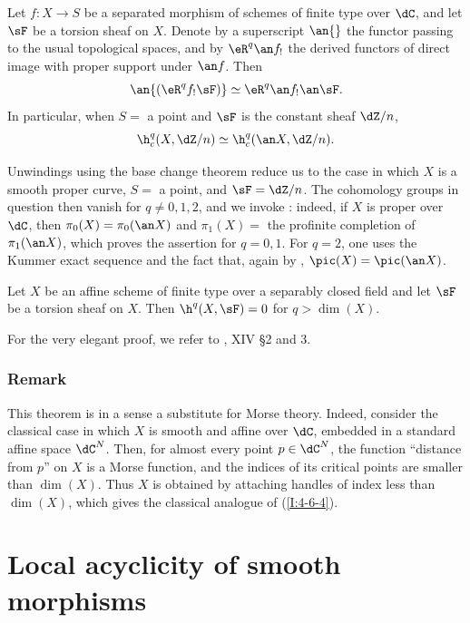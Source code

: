 \begin{theorem}\label{I:4-6-3}
Let $f:X\to S$ be a separated morphism of schemes of finite type over
$\dC$, and let $\sF$ be a torsion sheaf on $X$. Denote by a superscript
$\an{}$ the functor passing to the usual topological spaces, and by
$\eR^q\an f_!$ the derived functors of direct image with proper support
under $\an f$. Then
\[
  \an{(\eR^q f_! \sF)} \simeq \eR^q \an f_! \an \sF \text{.}
\]
In particular, when $S=$ a point and $\sF$ is the constant sheaf
$\dZ/n$,
\[
  \h_c^q(X,\dZ/n) \simeq \h_c^q(\an X,\dZ/n)\text{.}
\]
\end{theorem}

Unwindings using the base change theorem reduce us to the case in which
$X$ is a smooth proper curve, $S=$ a point, and $\sF=\dZ/n$. The
cohomology groups in question then vanish for $q\ne0,1,2$, and we invoke
\cite{se55}: indeed, if $X$ is proper over $\dC$, then
$\pi_0(X)=\pi_0(\an X)$ and $\pi_1(X)=$ the profinite completion of
$\pi_1(\an X)$, which proves the assertion for $q=0,1$. For $q=2$,
one uses the Kummer exact sequence and the fact that, again by
\cite{se55}, $\pic(X)=\pic(\an X)$.

\begin{theorem}\label{I:4-6-4}
Let $X$ be an affine scheme of finite type over a separably closed field
and let $\sF$ be a torsion sheaf on $X$. Then
$\h^q(X,\sF)=0$ for $q>\dim(X)$.
\end{theorem}

For the very elegant proof, we refer to \cite{sga4}, XIV \S 2 and 3.

\subsubsection{Remark}\label{I:4-6-5}

This theorem is in a sense a substitute for Morse theory. Indeed, consider
the classical case in which $X$ is smooth and affine over $\dC$, embedded
in a standard affine space $\dC^N$. Then, for almost every point
$p\in\dC^N$, the function “distance from $p$” on $X$ is a Morse
function, and the indices of its critical points are smaller than
$\dim(X)$. Thus $X$ is obtained by attaching handles of index less than
$\dim(X)$, which gives the classical analogue of (\ref{I:4-6-4}).

\section{Local acyclicity of smooth morphisms}\label{I:5}

